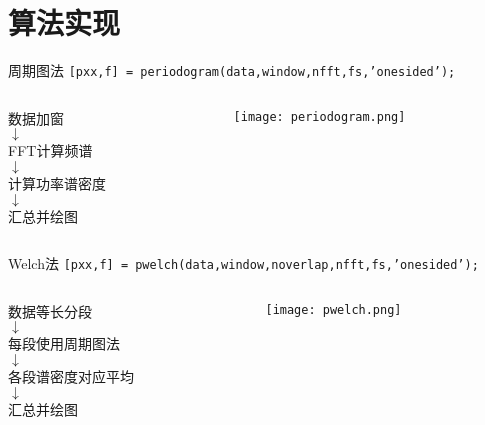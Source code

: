 \documentclass{beamer}
\begin{document}
\section{算法实现}
\begin{frame}{周期图法}
    \small
    \texttt{[pxx,f] = periodogram(data,window,nfft,fs,'onesided');}
    \vspace{\fill}
    \begin{columns}
        \begin{column}{0.4\textwidth}
            \centering\normalsize
            数据加窗 \\
            $\downarrow$ \\
            FFT计算频谱 \\
            $\downarrow$ \\
            计算功率谱密度 \\
            $\downarrow$ \\
            汇总并绘图
        \end{column}
        \begin{column}{0.6\textwidth}
            \centering
            \texttt{[image: periodogram.png]}
        \end{column}
    \end{columns}
\end{frame}

\begin{frame}{Welch法}
    \small
    \texttt{[pxx,f] = pwelch(data,window,noverlap,nfft,fs,'onesided');} 
    \vspace{\fill}
    \begin{columns}
        \begin{column}{0.4\textwidth}
            \centering\normalsize
            数据等长分段 \\
            $\downarrow$ \\
            每段使用周期图法 \\
            $\downarrow$ \\
            各段谱密度对应平均 \\
            $\downarrow$ \\
            汇总并绘图
        \end{column}
        \begin{column}{0.6\textwidth}
            \centering
            \texttt{[image: pwelch.png]}
        \end{column}
    \end{columns}
\end{frame}
\end{document}
